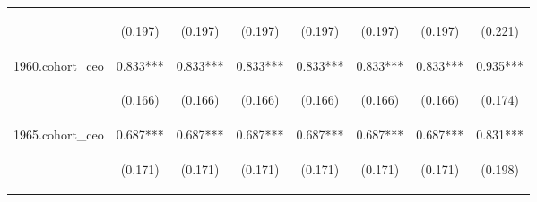 \begin{center}
\begin{tabular}{lccccccc}
\vspace{4pt} & \begin{footnotesize}(0.197)\end{footnotesize} & \begin{footnotesize}(0.197)\end{footnotesize} & \begin{footnotesize}(0.197)\end{footnotesize} & \begin{footnotesize}(0.197)\end{footnotesize} & \begin{footnotesize}(0.197)\end{footnotesize} & \begin{footnotesize}(0.197)\end{footnotesize} & \begin{footnotesize}(0.221)\end{footnotesize} \\
1960.cohort\_ceo & 0.833*** & 0.833*** & 0.833*** & 0.833*** & 0.833*** & 0.833*** & 0.935*** \\
\vspace{4pt} & \begin{footnotesize}(0.166)\end{footnotesize} & \begin{footnotesize}(0.166)\end{footnotesize} & \begin{footnotesize}(0.166)\end{footnotesize} & \begin{footnotesize}(0.166)\end{footnotesize} & \begin{footnotesize}(0.166)\end{footnotesize} & \begin{footnotesize}(0.166)\end{footnotesize} & \begin{footnotesize}(0.174)\end{footnotesize} \\
1965.cohort\_ceo & 0.687*** & 0.687*** & 0.687*** & 0.687*** & 0.687*** & 0.687*** & 0.831*** \\
\vspace{4pt} & \begin{footnotesize}(0.171)\end{footnotesize} & \begin{footnotesize}(0.171)\end{footnotesize} & \begin{footnotesize}(0.171)\end{footnotesize} & \begin{footnotesize}(0.171)\end{footnotesize} & \begin{footnotesize}(0.171)\end{footnotesize} & \begin{footnotesize}(0.171)\end{footnotesize} & \begin{footnotesize}(0.198)\end{footnotesize} \\

\end{tabular}
\end{center}
